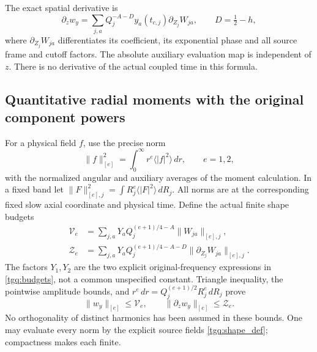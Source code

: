 The exact spatial derivative is
\[
 \partial_zw_y=\sum_{j,a}Q_j^{-A-D}y_a(t_{c,j})
          \partial_{Z_j}W_{ja},\qquad D=\tfrac12-h,
\]
where $\partial_{Z_j}W_{ja}$ differentiates its coefficient,
its exponential phase and all source frame and cutoff factors.
The absolute auxiliary evaluation map is independent of $z$.
There is no derivative of the actual coupled time in this formula.

\subsection{Quantitative radial moments with the original component powers}
\label{tgq:moment_budgets}
For a physical field $f$, use the precise norm
\[
 \|f\|_{[e]}^2=\int_0^\infty r^e\langle |f|^2\rangle\,dr,
 \qquad e=1,2,
\]
with the normalized angular and auxiliary averages of the moment
calculation. In a fixed band let
$\|F\|_{[e],j}^2=\int R_j^e\langle|F|^2\rangle\,dR_j$.
All norms are at the corresponding fixed slow axial coordinate and
physical time. Define the actual finite shape budgets
\begin{equation}
 \begin{split}
 \mathcal V_e&=
  \sum_{j,a}Y_a Q_j^{(e+1)/4-A}\|W_{ja}\|_{[e],j},\\
 \mathcal Z_e&=
  \sum_{j,a}Y_a Q_j^{(e+1)/4-A-D}
                              \|\partial_{Z_j}W_{ja}\|_{[e],j}.
 \end{split}\label{tgq:shape_budgets}
\end{equation}
The factors $Y_1,Y_2$ are the two explicit original-frequency expressions
in \eqref{tgq:budgets}, not a common unspecified constant. Triangle
inequality, the pointwise amplitude bounds, and
$r^e\,dr=Q_j^{(e+1)/2}R_j^e\,dR_j$ prove
\[
 \|w_y\|_{[e]}\le\mathcal V_e,\qquad
 \|\partial_zw_y\|_{[e]}\le\mathcal Z_e .
\]
No orthogonality of distinct harmonics has been assumed in these bounds.
One may evaluate every norm by the explicit source fields
\eqref{tgq:shape_def}; compactness makes each finite.


